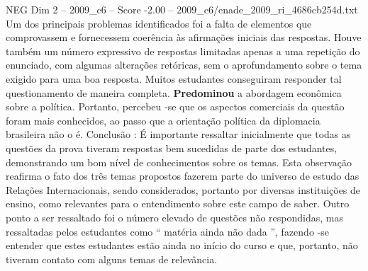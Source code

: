 \begin{textsample}{NEG Dim 2 – 2009\_c6 – Score -2.00 – 2009\_c6/enade\_2009\_ri\_4686cb254d.txt}
Um dos principais problemas identificados foi a falta de elementos que comprovassem e fornecessem coerência às afirmações iniciais das respostas.
Houve também um número expressivo de respostas limitadas apenas a uma repetição do enunciado, com algumas alterações retóricas, sem o aprofundamento sobre o tema exigido para uma boa resposta.
Muitos estudantes conseguiram responder tal questionamento de maneira completa. \textbf{Predominou} a abordagem econômica sobre a política.
Portanto, percebeu -se que os aspectos comerciais da questão foram mais conhecidos, ao passo que a orientação política da diplomacia brasileira não o é.
Conclusão : É importante ressaltar inicialmente que todas as questões da prova tiveram respostas bem sucedidas de parte dos estudantes, demonstrando um bom nível de conhecimentos sobre os temas.
Esta observação reafirma o fato dos três temas propostos fazerem parte do universo de estudo das Relações Internacionais, sendo considerados, portanto por diversas instituições de ensino, como relevantes para o entendimento sobre este campo de saber.
Outro ponto a ser ressaltado foi o número elevado de questões não respondidas, mas ressaltadas pelos estudantes como “ matéria ainda não dada ”, fazendo -se entender que estes estudantes estão ainda no início do curso e que, portanto, não tiveram contato com alguns temas de relevância.

\end{textsample}
